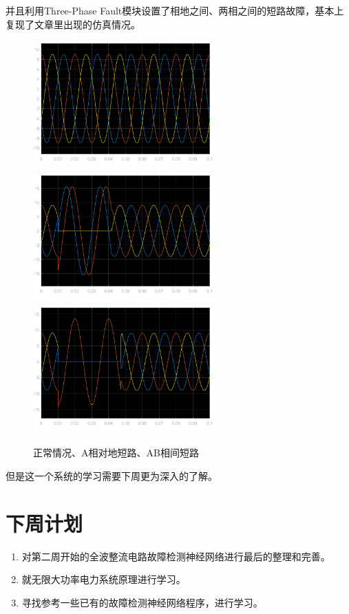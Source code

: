 \documentclass{article}
\begin{document}
	并且利用Three-Phase Fault模块设置了相地之间、两相之间的短路故障，基本上复现了文章里出现的仿真情况。
	
	\begin{figure}[htpb]
		\centering
		\includegraphics[width=7cm]{figure/normal_three_phase.png}
		\includegraphics[width=7cm]{figure/A_ground_short_three_phase.png}
		\includegraphics[width=7cm]{figure/A_B_short_three_phase.png}
		\caption{正常情况、A相对地短路、AB相间短路}
	\end{figure}
	但是这一个系统的学习需要下周更为深入的了解。
	
	\section{下周计划}
	
	\begin{enumerate}
		\item 对第二周开始的全波整流电路故障检测神经网络进行最后的整理和完善。
		\item 就无限大功率电力系统原理进行学习。
		\item 寻找参考一些已有的故障检测神经网络程序，进行学习。
	\end{enumerate}
\end{document}
